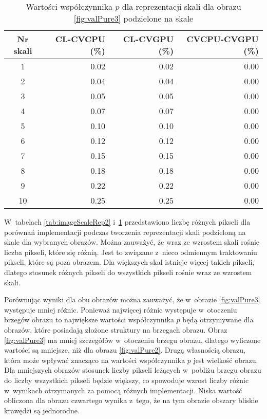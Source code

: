 \begin{center}
\begin{table}
\centering
\caption{Wartości współczynnika $ p $ dla reprezentacji skali dla obrazu \ref{fig:valPure3} podzielone na skale}
\label{tab:imageScaleRep3}
\begin{tabular}{|c|r|r|r|}
 \hline
Nr skali & CL-CVCPU (\%) & CL-CVGPU (\%) & CVCPU-CVGPU (\%) \\ \hline
1        & 0.02     & 0.02     & 0.00        \\ \hline
2        & 0.04     & 0.04     & 0.00        \\ \hline
3        & 0.05     & 0.05     & 0.00        \\ \hline
4        & 0.07     & 0.07     & 0.00        \\ \hline
5        & 0.10     & 0.10     & 0.00        \\ \hline
6        & 0.12     & 0.12     & 0.00        \\ \hline
7        & 0.15     & 0.15     & 0.00        \\ \hline
8        & 0.18     & 0.18     & 0.00        \\ \hline
9        & 0.22     & 0.22     & 0.00        \\ \hline
10       & 0.25     & 0.25     & 0.00        \\ \hline
\end{tabular}
\end{table}
\end{center}

W~tabelach \ref{tab:imageScaleRep2} i~\ref{tab:imageScaleRep3} przedstawiono liczbę różnych pikseli dla porównań implementacji podczas tworzenia reprezentacji skali podzieloną na skale dla wybranych obrazów. Można zauważyć, że wraz ze wzrostem skali rośnie liczba pikseli, które się różnią. Jest to związane z~nieco odmiennym traktowaniu pikseli, które są poza obrazem. Dla większych skal istnieje więcej takich pikseli, dlatego stosunek różnych pikseli do wszystkich pikseli rośnie wraz ze wzrostem skali.

Porównując wyniki dla obu obrazów można zauważyć, że w~obrazie \ref{fig:valPure3} występuje mniej różnic. Ponieważ najwięcej różnic występuje w~otoczeniu brzegów obrazu to największe wartości współczynnika $ p $ będą otrzymywane dla obrazów, które posiadają złożone struktury na brzegach obrazu. Obraz \ref{fig:valPure3} ma mniej szczegółów w~otoczeniu brzegu obrazu, dlatego wyliczone wartości są mniejsze, niż dla obrazu \ref{fig:valPure2}. Drugą własnością obrazu, która może wpływać znacząco na wartości współczynnika $ p $ jest wielkość obrazu. Dla mniejszych obrazów stosunek liczby pikseli leżących w~pobliżu brzegu obrazu do liczby wszystkich pikseli będzie większy, co spowoduje wzrost liczby różnic w~wynikach otrzymanych za pomocą różnych implementacji. Niska wartość obliczona dla obrazu czwartego wynika z~tego, że na tym obrazie obszary bliskie krawędzi są jednorodne.

